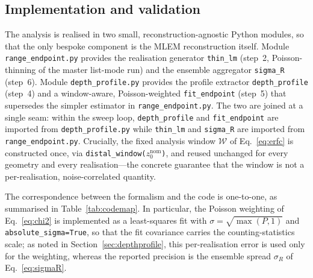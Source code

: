 \documentclass[11pt]{article}
\begin{document}
\subsection{Implementation and validation}
\label{sec:implementation}

The analysis is realised in two small, reconstruction-agnostic Python modules, so
that the only bespoke component is the MLEM reconstruction itself. Module
\texttt{range\_endpoint.py} provides the realisation generator
\texttt{thin\_lm} (step~2, Poisson-thinning of the master list-mode run) and the
ensemble aggregator \texttt{sigma\_R} (step~6). Module \texttt{depth\_profile.py}
provides the profile extractor \texttt{depth\_profile} (step~4) and a
window-aware, Poisson-weighted \texttt{fit\_endpoint} (step~5) that supersedes the
simpler estimator in \texttt{range\_endpoint.py}. The two are joined at a single
seam: within the sweep loop, \texttt{depth\_profile} and \texttt{fit\_endpoint}
are imported from \texttt{depth\_profile.py} while \texttt{thin\_lm} and
\texttt{sigma\_R} are imported from \texttt{range\_endpoint.py}. Crucially, the
fixed analysis window \(\mathcal{W}\) of Eq.~\eqref{eq:erfc} is constructed once,
via \texttt{distal\_window(}\(z_0^{\mathrm{nom}}\)\texttt{)}, and reused unchanged
for every geometry and every realisation---the concrete guarantee that the window
is not a per-realisation, noise-correlated quantity.

The correspondence between the formalism and the code is one-to-one, as
summarised in Table~\ref{tab:codemap}. In particular, the Poisson weighting of
Eq.~\eqref{eq:chi2} is implemented as a least-squares fit with
\(\sigma=\sqrt{\max(P,1)}\) and \texttt{absolute\_sigma=True}, so that the fit
covariance carries the counting-statistics scale; as noted in
Section~\ref{sec:depthprofile}, this per-realisation error is used only for the
weighting, whereas the reported precision is the ensemble spread
\(\sigma_R\) of Eq.~\eqref{eq:sigmaR}.
\end{document}
